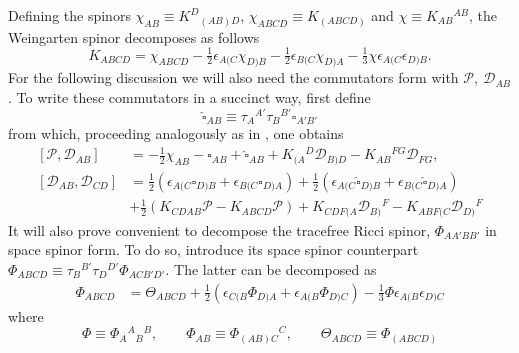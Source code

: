 \documentclass[10pt,a4paper]{article}
\theoremstyle{plain}
\begin{document}
Defining the spinors $\chi_{AB}\equiv K^D{}_{(AB)D}$,
$\chi_{ABCD}\equiv K_{(ABCD)}$ and $\chi\equiv K_{AB}{}^{AB}$, the
Weingarten spinor decomposes as follows
\begin{equation}
\label{ExtrinsicCurvatureSplit}
K_{ABCD} = \chi_{ABCD} - \tfrac{1}{2} \epsilon_{A(C}\chi_{D)B} -
\tfrac{1}{2} \epsilon_{B(C}\chi_{D)A} - \tfrac{1}{3} \chi
\epsilon_{A(C} \epsilon_{D)B}.
\end{equation}
For the following discussion we will also need the commutators form
with $\mathcal{P},~\mathcal{D}_{AB}$. To write these commutators in a
succinct way, first define
\[\widehat{\square}_{AB}\equiv \tau_A{}^{A'}\tau_B{}^{B'}\square_{A'B'}\]
from which, proceeding analogously as in \cite{BaeVal10b}, one obtains
\begin{align}
 \left[\mathcal{P},\mathcal{D}_{AB}
   \right]&=-\tfrac{1}{2}\chi_{AB}-\square_{AB}+\widehat{\square}_{AB}
+K_{(A}{}^D\mathcal{D}_{B)D}-K_{AB}{}^{FG}\mathcal{D}_{FG}, \label{CommutatorNormalSenDeriv}
\\ \left[\mathcal{D}_{AB},\mathcal{D}_{CD}\right]&=
\tfrac{1}{2}\left(\epsilon_{A(C}\square_{D)B}+\epsilon_{B(C}\square_{D)A}\right)
+\tfrac{1}{2}\left(\epsilon_{A(C}\widehat{\square}_{D)B}+\epsilon_{B(C}\widehat{\square}_{D)A}\right)
 \nonumber \\ &
 +\tfrac{1}{2}\left(K_{CDAB}\mathcal{P}-K_{ABCD}\mathcal{P}\right)
+K_{CDF(A}\mathcal{D}_{B)}{}^F-K_{ABF(C}\mathcal{D}_{D)}{}^F \label{CommutatorSenSenDeriv}
\end{align}
It will also prove convenient to decompose the tracefree Ricci spinor,
$\Phi_{AA'BB'}$ in space spinor form. To do so, introduce its space
spinor counterpart $\Phi_{ABCD}\equiv\tau_{B}{}^{B'} \tau_{D}{}^{D'}
\Phi_{ACB'D'}$.  The latter can be decomposed as
\begin{align}
\label{RicciSpaceSpinorSplit}
\Phi_{ABCD}& = \Theta_{ABCD} + \tfrac{1}{2}
\left(\epsilon_{C(B}\Phi_{D)A} + \epsilon_{A(B}\Phi_{D)C}\right) -
\tfrac{1}{3} \Phi \epsilon_{A(B}\epsilon_{D)C}
\end{align}
where
\[ \Phi \equiv \Phi_{A}{}^{A}{}_{B}{}^{B},\qquad \Phi_{AB} \equiv \Phi_{(AB)C}{}^{C},\qquad
 \Theta_{ABCD} \equiv \Phi_{(ABCD)}\]
\end{document}
